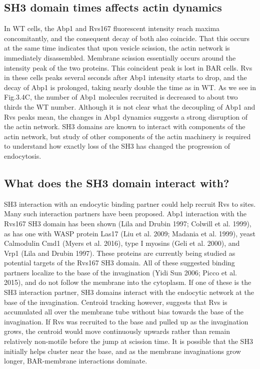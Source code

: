\subsection{SH3 domain times affects actin dynamics}
In WT cells, the Abp1 and Rvs167 fluorescent intensity reach maxima concomitantly, and the consequent decay of both also coincide. That this occurs at the same time indicates that upon vesicle scission, the actin network is immediately disassembled. Membrane scission essentially occurs around the intensity peak of the two proteins. This coincident peak is lost in BAR cells. Rvs in these cells peaks several seconds after Abp1 intensity starts to drop, and the decay of Abp1 is prolonged, taking nearly double the time as in WT. As we see in Fig.3.4C, the number of Abp1 molecules recruited is decreased to about two thirds the WT number. Although it is not clear what the decoupling of Abp1 and Rvs peaks mean, the changes in Abp1 dynamics suggests a strong disruption of the actin network. SH3 domains are known to interact with components of the actin network, but study of other components of the actin machinery is required to understand how exactly loss of the SH3 has changed the progression of endocytosis.  

\subsection{What does the SH3 domain interact with?}
SH3 interaction with an endocytic binding partner could help recruit Rvs to sites. Many such interaction partners have been proposed. Abp1 interaction with the Rvs167 SH3 domain has been shown (Lila and Drubin 1997; Colwill et al. 1999), as has one with WASP protein Las17 (Liu et al. 2009; Madania et al. 1999), yeast Calmodulin Cmd1 (Myers et al. 2016), type I myosins (Geli et al. 2000), and Vrp1 (Lila and Drubin 1997). These proteins are currently being studied as potential targets of the Rvs167 SH3 domain. All of these suggested binding partners localize to the base of the invagination (Yidi Sun 2006; Picco et al. 2015), and do not follow the membrane into the cytoplasm. If one of these is the SH3 interaction partner, SH3 domains interact with the endocytic network at the base of the invagination. Centroid tracking however, suggests that Rvs is accumulated all over the membrane tube without bias towards the base of the invagination. If Rvs was recruited to the base and pulled up as the invagination grows, the centroid would move continuously upwards rather than remain relatively non-motile before the jump at scission time. It is possible that the SH3 initially helps cluster near the base, and as the membrane invaginations grow longer, BAR-membrane interactions dominate. 




